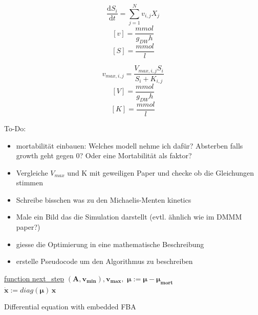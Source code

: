 \documentclass[a4paper,10pt]{article}
\begin{document}
\begin{equation}
 \frac{\mathrm d S_i}{\mathrm d t} = \displaystyle\sum_{j=1}^{N} v_{i,j} X_j
\end{equation}
\begin{equation}
 \left[ v \right] = \frac{mmol}{g_{DW} h}
\end{equation}
\begin{equation}
 \left[ S \right] = \frac{mmol}{l}
\end{equation}

\begin{equation}
 v_{max,i,j} = \frac{V_{max,i,j} S_i}{S_i + K_{i,j}}
\end{equation}
\begin{equation}
 \left[ V \right] = \frac{mmol}{g_{DW} h}
\end{equation}
\begin{equation}
 \left[ K \right] = \frac{mmol}{l}
\end{equation}

To-Do:
\begin{itemize}
 \item mortabilität einbauen: Welches modell nehme ich dafür? Absterben falls growth geht gegen 0? Oder eine Mortabilität als faktor?
 \item Vergleiche $V_{max}$ und K mit geweiligen Paper und checke ob die Gleichungen stimmen
 \item Schreibe bisschen was zu den Michaelis-Menten kinetics
 \item Male ein Bild das die Simulation darstellt (evtl. ähnlich wie im DMMM paper?)
 \item giesse die Optimierung in eine mathematische Beschreibung
 \item erstelle Pseudocode um den Algorithmus zu beschreiben
\end{itemize}

\begin{algorithm}

    \underline{function next\_step} $(\bm{A}, \bm{v_{min}}), \bm{v_{max}}, $\;
    \Input{}
    $\bm{\mu} := \bm{\mu} - \bm{\mu_{mort}}$\\
    $\dot{\bm{x}} := diag(\bm{\mu}) \, \bm{x}$\\
    \caption{Differential equation with embedded FBA}
\end{algorithm}
\end{document}

